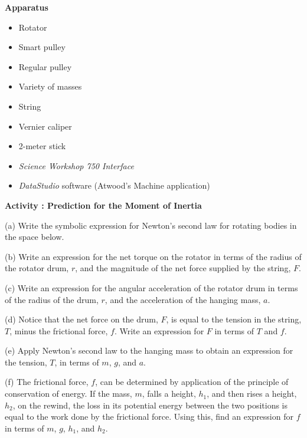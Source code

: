 \textbf{Apparatus}

\begin{itemize}
\item Rotator
\item Smart pulley
\item Regular pulley
\item Variety of masses
\item String
\item Vernier caliper
\item 2-meter stick
\item \textit{Science Workshop 750 Interface}
\item \textit{DataStudio} software (Atwood's Machine application)
\end{itemize}
\textbf{Activity  : Prediction for the Moment of Inertia} 

(a) Write the symbolic expression for Newton's second law for rotating bodies
in the space below.
\vspace{10mm}

(b) Write an expression for the net torque on the rotator in terms of the radius
of the rotator drum, $r$, and the magnitude of the net force supplied by the string,
$F$.
\vspace{10mm}

(c) Write an expression for the angular acceleration of the rotator drum in
terms of the radius of the drum, $r$, and the acceleration of the hanging mass,
$a$.
\vspace{10mm}

(d) Notice that the net force on the drum, $F$, is equal to the tension in the
string, $T$, minus the frictional force, $f$. Write an expression for 
$F$ in terms
of $T$ and $f$.
\vspace{10mm}

(e) Apply Newton's second law to the hanging mass to obtain an expression for
the tension, $T$, in terms of $m$, $g$, and $a$.
\vspace{20mm}

(f) The frictional force, $f$, can be determined by application of the principle
of conservation of energy. If the mass, $m$, falls a height, \( h_{1} \), and
then rises a height, \( h_{2} \), on the rewind, the loss in its potential
energy between the two positions is equal to the work done by the frictional
force. Using this, find an expression for $f$ in terms of $m$, $g$, \( h_{1} \),
and \( h_{2} \).
\vspace{20mm}

